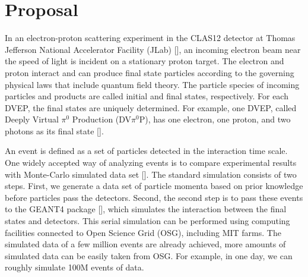 \documentclass{article}
\begin{document}

\section{Proposal}
\quad In an electron-proton scattering experiment in the CLAS12 detector at Thomas Jefferson National Accelerator Facility (JLab) [\citet{BURKERT2020163419}], an incoming electron beam near the speed of light is incident on a stationary proton target. The electron and proton interact and can produce final state particles according to the governing physical laws that include quantum field theory. The particle species of incoming particles and products are called initial and final states, respectively. For each DVEP, the final states are uniquely determined. For example, one DVEP, called Deeply Virtual $\pi^0$ Production (DV$\pi^0$P), has one electron, one proton, and two photons as its final state [\citet{PhysRevD.55.7114}].

\quad An event is defined as a set of particles detected in the interaction time scale. One widely accepted way of analyzing events is to compare experimental results with Monte-Carlo simulated data set [\citet{PhysRevLett.115.212003, 10.1093/ptep/ptaa104}]. The standard simulation consists of two steps. First, we generate a data set of particle momenta based on prior knowledge before particles pass the detectors. Second, the second step is to pass these events to the GEANT4 package [\citet{AGOSTINELLI2003250}], which simulates the interaction between the final states and detectors. This serial simulation can be performed using computing facilities connected to Open Science Grid (OSG), including MIT farms. The simulated data of a few million events are already achieved, more amounts of simulated data can be easily taken from OSG. For example, in one day, we can roughly simulate 100M events of data.
\end{document}
